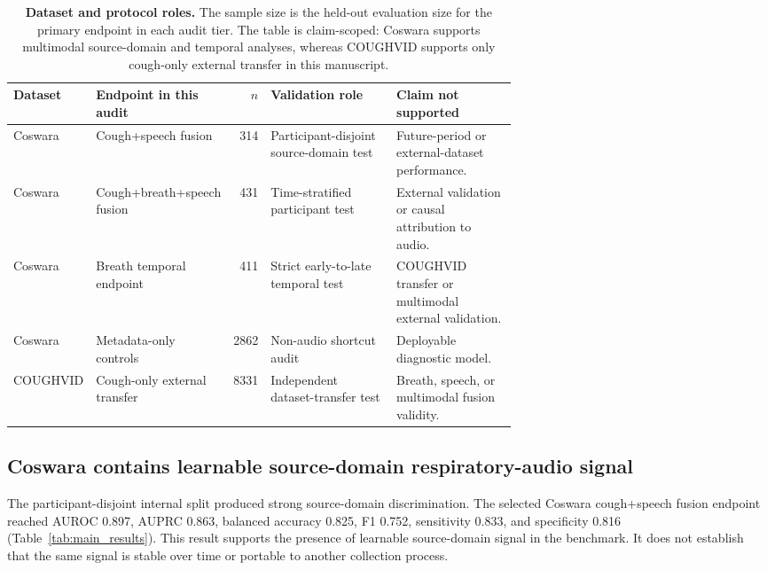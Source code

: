 \documentclass[11pt]{article}
\begin{document}
\begin{table}[t]
\centering
\caption{\textbf{Dataset and protocol roles.} The sample size is the held-out evaluation size for the primary endpoint in each audit tier. The table is claim-scoped: Coswara supports multimodal source-domain and temporal analyses, whereas COUGHVID supports only cough-only external transfer in this manuscript.}
\label{tab:dataset_roles}
\scriptsize
\setlength{\tabcolsep}{2.5pt}
\begin{tabularx}{\linewidth}{L{0.16\linewidth} L{0.25\linewidth} r L{0.25\linewidth} Y}
\toprule
Dataset & Endpoint in this audit & $n$ & Validation role & Claim not supported \\
\midrule
Coswara & Cough+speech fusion & 314 & Participant-disjoint source-domain test & Future-period or external-dataset performance. \\
Coswara & Cough+breath+speech fusion & 431 & Time-stratified participant test & External validation or causal attribution to audio. \\
Coswara & Breath temporal endpoint & 411 & Strict early-to-late temporal test & COUGHVID transfer or multimodal external validation. \\
Coswara & Metadata-only controls & 2862 & Non-audio shortcut audit & Deployable diagnostic model. \\
COUGHVID & Cough-only external transfer & 8331 & Independent dataset-transfer test & Breath, speech, or multimodal fusion validity. \\
\bottomrule
\end{tabularx}
\end{table}

\subsection*{Coswara contains learnable source-domain respiratory-audio signal}

The participant-disjoint internal split produced strong source-domain discrimination. The selected Coswara cough+speech fusion endpoint reached AUROC 0.897, AUPRC 0.863, balanced accuracy 0.825, F1 0.752, sensitivity 0.833, and specificity 0.816 (Table~\ref{tab:main_results}). This result supports the presence of learnable source-domain signal in the benchmark. It does not establish that the same signal is stable over time or portable to another collection process.
\end{document}
